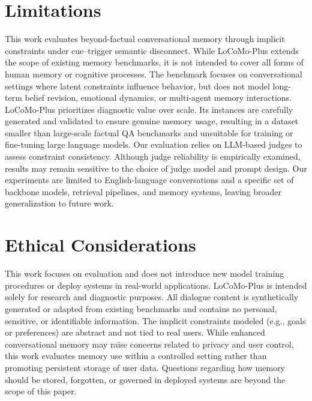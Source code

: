 \documentclass[11pt]{article}
\begin{document}
\section*{Limitations}

This work evaluates beyond-factual conversational memory through
implicit constraints under cue--trigger semantic disconnect.
While LoCoMo-Plus extends the scope of existing memory benchmarks, it is
not intended to cover all forms of human memory or cognitive processes.
The benchmark focuses on conversational settings where latent
constraints influence behavior, but does not model long-term belief
revision, emotional dynamics, or multi-agent memory interactions.
LoCoMo-Plus prioritizes diagnostic value over scale.
Its instances are carefully generated and validated to ensure genuine
memory usage, resulting in a dataset smaller than large-scale factual QA
benchmarks and unsuitable for training or fine-tuning large language
models.
Our evaluation relies on LLM-based judges to assess constraint
consistency.
Although judge reliability is empirically examined, results may remain
sensitive to the choice of judge model and prompt design.
Our experiments are limited to English-language conversations and a
specific set of backbone models, retrieval pipelines, and memory
systems, leaving broader generalization to future work.

\section*{Ethical Considerations}

This work focuses on evaluation and does not introduce new model
training procedures or deploy systems in real-world applications.
LoCoMo-Plus is intended solely for research and diagnostic purposes.
All dialogue content is synthetically generated or adapted from existing
benchmarks and contains no personal, sensitive, or identifiable
information.
The implicit constraints modeled (e.g., goals or preferences) are
abstract and not tied to real users.
While enhanced conversational memory may raise concerns related to
privacy and user control, this work evaluates memory use within a
controlled setting rather than promoting persistent storage of user
data.
Questions regarding how memory should be stored, forgotten, or governed
in deployed systems are beyond the scope of this paper.


%

\end{document}
